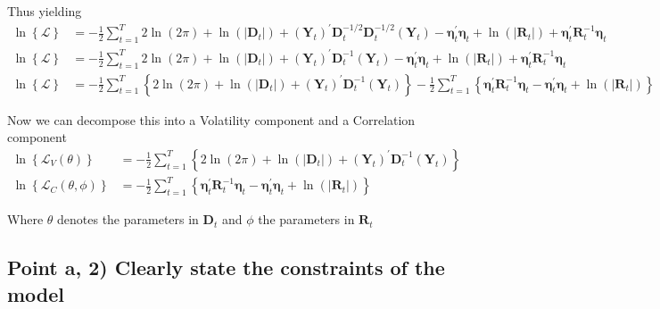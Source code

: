 \documentclass{article}
\begin{document}
Thus yielding
\begin{align*}
\ln\left\{ \mathcal{L}\right\}  & =-\frac{1}{2}\sum_{t=1}^{T}2\ln\left(2\pi\right)+\ln\left(\left\rvert \mathbf{D}_{t}\right\rvert \right)+\left(\mathbf{Y}_{t}\right)^{\prime}\mathbf{D}_{t}^{-1/2}\mathbf{D}_{t}^{-1/2}\left(\mathbf{Y}_{t}\right)-\boldsymbol{\eta}_{t}^{\prime}\boldsymbol{\eta}_{t}+\ln\left(\left\rvert \mathbf{R}_{t}\right\rvert \right)+\boldsymbol{\eta}_{t}^{\prime}\mathbf{R}_{t}^{-1}\boldsymbol{\eta}_{t}\\
\ln\left\{ \mathcal{L}\right\}  & =-\frac{1}{2}\sum_{t=1}^{T}2\ln\left(2\pi\right)+\ln\left(\left\rvert \mathbf{D}_{t}\right\rvert \right)+\left(\mathbf{Y}_{t}\right)^{\prime}\mathbf{D}_{t}^{-1}\left(\mathbf{Y}_{t}\right)-\boldsymbol{\eta}_{t}^{\prime}\boldsymbol{\eta}_{t}+\ln\left(\left\rvert \mathbf{R}_{t}\right\rvert \right)+\boldsymbol{\eta}_{t}^{\prime}\mathbf{R}_{t}^{-1}\boldsymbol{\eta}_{t}\\
\ln\left\{ \mathcal{L}\right\}  & =-\frac{1}{2}\sum_{t=1}^{T}\left\{ 2\ln\left(2\pi\right)+\ln\left(\left\rvert \mathbf{D}_{t}\right\rvert \right)+\left(\mathbf{Y}_{t}\right)^{\prime}\mathbf{D}_{t}^{-1}\left(\mathbf{Y}_{t}\right)\right\} -\frac{1}{2}\sum_{t=1}^{T}\left\{ \boldsymbol{\eta}_{t}^{\prime}\mathbf{R}_{t}^{-1}\boldsymbol{\eta}_{t}-\boldsymbol{\eta}_{t}^{\prime}\boldsymbol{\eta}_{t}+\ln\left(\left\rvert \mathbf{R}_{t}\right\rvert \right)\right\} 
\end{align*}

Now we can decompose this into a Volatility component and a Correlation
component
\begin{align*}
\ln\left\{ \mathcal{L}_{V}\left(\theta\right)\right\}  & =-\frac{1}{2}\sum_{t=1}^{T}\left\{ 2\ln\left(2\pi\right)+\ln\left(\left\rvert \mathbf{D}_{t}\right\rvert \right)+\left(\mathbf{Y}_{t}\right)^{\prime}\mathbf{D}_{t}^{-1}\left(\mathbf{Y}_{t}\right)\right\} \\
\ln\left\{ \mathcal{L}_{C}\left(\theta,\phi\right)\right\}  & =-\frac{1}{2}\sum_{t=1}^{T}\left\{ \boldsymbol{\eta}_{t}^{\prime}\mathbf{R}_{t}^{-1}\boldsymbol{\eta}_{t}-\boldsymbol{\eta}_{t}^{\prime}\boldsymbol{\eta}_{t}+\ln\left(\left\rvert \mathbf{R}_{t}\right\rvert \right)\right\} 
\end{align*}

Where $\theta$ denotes the parameters in $\mathbf{D}_{t}$ and $\phi$
the parameters in $\mathbf{R}_{t}$

\subsection{Point a, 2) Clearly state the constraints of the model}
\end{document}
